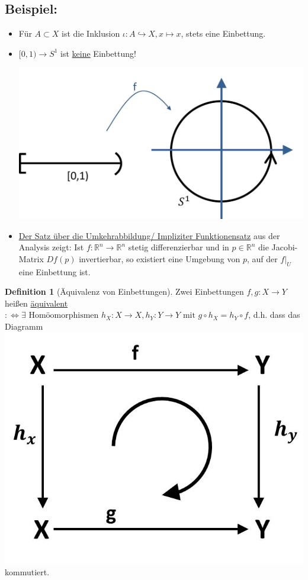 \documentclass[a4paper,11pt,notitlepage]{report}
\theoremstyle{remark}
\theoremstyle{definition}
\newtheorem{definition}{Definition}[chapter]
\newcommand{\R}{{\ensuremath{\mathbb{R}}}}
\newenvironment{bsp}[1]
{
\setlength{\fboxsep}{10pt}
\subsection*{Beispiel: #1}
\begin{upshape}
}
{
\end{upshape}
}
\begin{document}
\begin{bsp}{}
	\begin{itemize}
		\item Für $A \subset X$ ist die Inklusion $\iota \colon A \hookrightarrow X, x \mapsto x$, stets eine Einbettung.
		\item $[0,1) \rightarrow S^1$ ist \underline{keine} Einbettung!
		\begin{center}
			\includegraphics[scale=0.25]{images/0_1_nach_S1_Pfeil.jpg}
		\end{center}
		\item \underline{Der Satz über die Umkehrabbildung/ Impliziter Funktionensatz} aus der Analysis zeigt: 
			\newline
			Ist $f \colon \R^n \rightarrow \R^n$ stetig differenzierbar und in $p \in \R^n$ die Jacobi-Matrix $Df(p)$ invertierbar, so existiert eine Umgebung von $p$, auf der $f \big |_U$ eine Einbettung ist.
	\end{itemize}
\end{bsp}

\begin{definition}[Äquivalenz von Einbettungen]
	Zwei Einbettungen $f,g \colon X \rightarrow Y$ heißen \underline{äquivalent} $:\Leftrightarrow \exists \text{ Homöomorphismen } h_X \colon X \rightarrow X, h_Y \colon Y \rightarrow Y \text{ mit } g \circ h_X = h_Y \circ f$, d.h. dass das Diagramm 
		\includegraphics[scale=0.3]{images/homotopieaequivalenz.jpg} kommutiert.
\end{definition}
\end{document}
